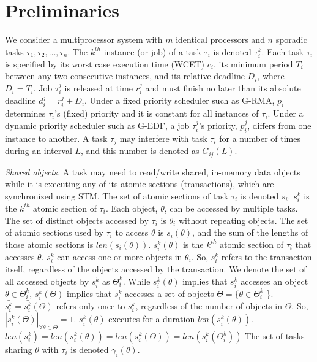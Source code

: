 \documentclass[conference]{IEEEtran}
\begin{document}
\section{Preliminaries}
\label{sec:model}

We consider a multiprocessor system with $m$ identical processors and $n$ sporadic tasks $\tau_1, \tau_2,\ldots, \tau_n$. The $k^{th}$ instance (or job) of a task $\tau_i$ is denoted $\tau_i^k$. Each task $\tau_i$ is specified by its worst case execution time (WCET) $c_i$, its minimum period $T_i$ between any two consecutive instances, and its relative deadline $D_i$, where $D_i=T_i$. Job $\tau_i^j$ is released at time $r_i^j$ and must finish no later than its absolute deadline $d_i^j=r_i^j+D_i$. Under a fixed priority scheduler such as G-RMA, $p_i$ determines $\tau_i$'s (fixed) priority and it is constant for all instances of $\tau_i$. Under a dynamic priority scheduler such as G-EDF, a job $\tau_i^j$'s priority, $p_i^j$, differs from one instance to another. 
A task $\tau_j$ may interfere with task $\tau_i$ for a number of times during an interval $L$, and this number is denoted as $G_{ij}(L)$. 


\textit{Shared objects.}
 A task may need to read/write shared, in-memory data objects while it is executing any of its atomic sections (transactions), which are synchronized using STM. 
The set of atomic sections of task $\tau_i$ is denoted $s_i$. $s_i^k$ is the $k^{th}$ atomic section of $\tau_i$. 
Each object, $\theta$, can be accessed by multiple tasks. The set of distinct objects accessed by $\tau_i$ is $\theta_i$ without repeating objects.
The set of atomic sections used by $\tau_i$ to access $\theta$ is $s_i(\theta)$, and the sum of the lengths of those atomic sections is $len(s_i(\theta))$. $s_i^k(\theta)$ is the $k^{th}$ atomic section of $\tau_i$ that accesses $\theta$.
%
 $s_i^k$ can access one or more objects in $\theta_i$. So, $s_i^k$ refers to the transaction itself, regardless of the objects accessed by the transaction. We denote the set of all accessed objects by $s_i^k$ as $\Theta_i^k$. While $s_i^k(\theta)$ implies that $s_i^k$ accesses an object $\theta \in \Theta_i^k$, $s_i^k(\Theta)$ implies that $s_i^k$ accesses a set of objects $\Theta=\{\theta \in \Theta_i^k$ \}. $\bar{s_i^k}=\bar{s_i^k}(\Theta)$ refers only once to $s_i^k$, regardless of the number of objects in $\Theta$. So, $|\bar{s_i^k}(\Theta)|_{\forall \theta \in \Theta}=1$.
%
 $s_i^k(\theta)$  executes for a duration $len(s_i^k(\theta))$. $len(s_i^k)=len(s_i^k(\theta))=len(s_i^k(\Theta))=len(s_i^k(\Theta_i^k))$ The set of tasks sharing $\theta$ with $\tau_i$ is denoted $\gamma_i(\theta)$. 
\end{document}
